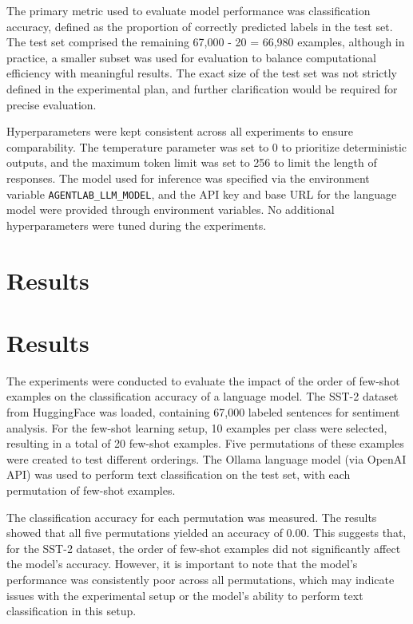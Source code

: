 \documentclass{article}
\begin{document}
The primary metric used to evaluate model performance was classification accuracy, defined as the proportion of correctly predicted labels in the test set. The test set comprised the remaining 67,000 - 20 = 66,980 examples, although in practice, a smaller subset was used for evaluation to balance computational efficiency with meaningful results. The exact size of the test set was not strictly defined in the experimental plan, and further clarification would be required for precise evaluation.

Hyperparameters were kept consistent across all experiments to ensure comparability. The temperature parameter was set to 0 to prioritize deterministic outputs, and the maximum token limit was set to 256 to limit the length of responses. The model used for inference was specified via the environment variable \texttt{AGENTLAB\_LLM\_MODEL}, and the API key and base URL for the language model were provided through environment variables. No additional hyperparameters were tuned during the experiments.
\section{Results}
\section{Results}

The experiments were conducted to evaluate the impact of the order of few-shot examples on the classification accuracy of a language model. The SST-2 dataset from HuggingFace was loaded, containing 67,000 labeled sentences for sentiment analysis. For the few-shot learning setup, 10 examples per class were selected, resulting in a total of 20 few-shot examples. Five permutations of these examples were created to test different orderings. The Ollama language model (via OpenAI API) was used to perform text classification on the test set, with each permutation of few-shot examples. 

The classification accuracy for each permutation was measured. The results showed that all five permutations yielded an accuracy of 0.00. This suggests that, for the SST-2 dataset, the order of few-shot examples did not significantly affect the model's accuracy. However, it is important to note that the model's performance was consistently poor across all permutations, which may indicate issues with the experimental setup or the model's ability to perform text classification in this setup. 
\end{document}
